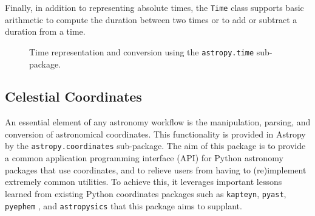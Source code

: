 \documentclass[traditabstract]{aa}
\begin{document}
Finally, in addition to representing absolute times, the \verb|Time| class supports
basic arithmetic to compute the duration between two times or to add or
subtract a duration from a time.


\begin{figure}
\center
\caption{Time representation and conversion using the \texttt{astropy.time} sub-package.\label{code:time}}
\vspace{0.1in}
\end{figure}

\subsection{Celestial Coordinates}


An essential element of any astronomy workflow is the manipulation, parsing,
and conversion of astronomical coordinates. This functionality is provided
in Astropy by
the \texttt{astropy.coordinates} sub-package. The aim of this package is to
provide a common application programming interface (API) for Python astronomy
packages that use coordinates, and to relieve users from having to
(re)implement extremely common utilities. To achieve this, it leverages
important lessons learned from existing Python coordinates packages such as
\texttt{kapteyn}, \texttt{pyast}, \texttt{pyephem} \citep{pyephem}, and
\texttt{astropysics} \citep{astropysics} that this package aims to supplant.
\end{document}
